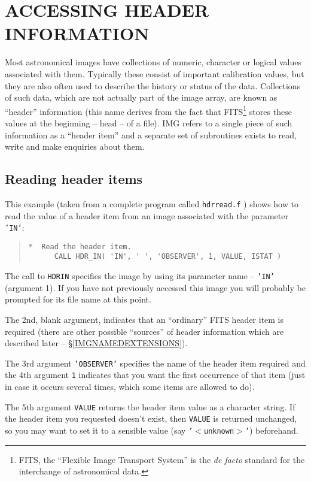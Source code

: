 \documentclass[twoside,11pt]{article}
\newcommand{\htmladdnormallink}[2]{#1}
\newcommand{\hyperref}[4]{#2\ref{#4}#3}
\newcommand{\htmlref}[2]{#1}
\renewcommand{\_}{\texttt{\symbol{95}}}
\newcommand{\myverb}[1]{{\texttt{#1}}}
\newenvironment{code}{\begin{small} \begin{quote}}
                     {\end{quote} \end{small}}
\begin{document}
\section{ACCESSING HEADER INFORMATION}
Most astronomical images have collections of numeric, character or
logical values associated with them. Typically these consist of
important calibration values, but they are also often used to describe
the history or status of the data. Collections of such data, which are
not actually part of the image array, are known as ``header''
information (this name derives from the fact that FITS\footnote{FITS,
the ``Flexible Image Transport System'' is the {\em de facto} standard
for the interchange of astronomical data.}  stores these values at the
beginning -- head -- of a file). IMG refers to a single piece of such
information as a ``header item'' and a separate set of subroutines
exists to read, write and make enquiries about them.

\subsection{Reading header items}
This example (taken from a complete program called
\htmladdnormallink{\myverb{hdrread.f}}{../../bin/examples/img/hdrread.f}
) shows how to read the value of a
header item from an image associated with the parameter \myverb{'IN'}:
\begin{code}
\begin{verbatim}
*  Read the header item.
      CALL HDR_IN( 'IN', ' ', 'OBSERVER', 1, VALUE, ISTAT )
\end{verbatim}
\end{code}
The call to \htmlref{\myverb{HDR\_IN}}{HDR_INx} specifies the image by using its
parameter name -- \myverb{'IN'} (argument 1). If you have not
previously accessed this image you will probably be prompted for its
file name at this point.

The 2nd, blank argument, indicates that an ``ordinary'' FITS header
item is required (there are other possible ``sources'' of header information
which are described
\hyperref{elsewhere}{later -- \S}{}{IMGNAMEDEXTENSIONS}).

The 3rd argument \myverb{'OBSERVER'} specifies the name of the header
item required and the 4th argument \myverb{1} indicates that you want
the first occurrence of that item (just in case it occurs several
times, which some items are allowed to do).

The 5th argument \myverb{VALUE} returns the header item value as a
character string. If the header item you requested doesn't exist, then
\myverb{VALUE} is returned unchanged, so you may want to set it to a
sensible value (say \myverb{'$<$unknown$>$'}) beforehand.
\end{document}
